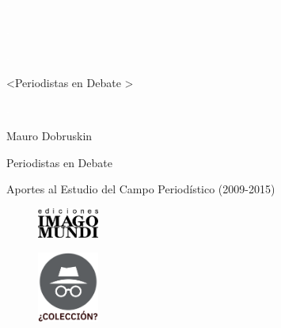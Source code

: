 \newpage
\thispagestyle{empty}
{\textcolor{white}{.}}

\newpage
\thispagestyle{empty}
{\textcolor{white}{.}}

\newpage
\thispagestyle{empty}
{\textcolor{white}{.}}

\vspace{30mm}

\begin{center}
	\LARGE{<Periodistas en Debate >}
\end{center}

\newpage
\thispagestyle{empty}
{\textcolor{white}{.}}

\newpage
\thispagestyle{empty}
\begin{center}%
{\sc\large{Mauro Dobruskin}}\\ %
\end{center}

\vspace{30mm}

\begin{center}
\LARGE{Periodistas en Debate}\\\vspace{10mm}

\Large{Aportes al Estudio del Campo Periodístico (2009-2015)}
\end{center}

\vfill

\begin{figure}[b]
\centering
\includegraphics[width=20mm]{./media/logo-imago-ByW.png}
\end{figure}

\newpage
\thispagestyle{empty}
\begin{figure}[t]
\centering
\vspace{-10mm}
\includegraphics[width=20mm]{./media/desconocido.png}\\
\end{figure}

